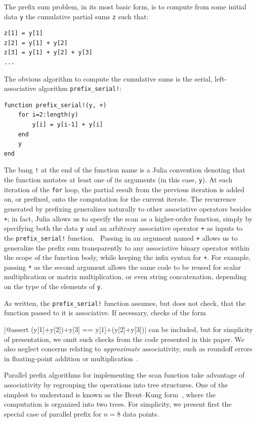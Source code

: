 \documentclass{sig-alternate}
\newcommand{\code}[1]{\texttt{#1}}
\begin{document}
The prefix sum problem, in its most basic form, is to compute from some initial
data \code{y} the cumulative partial sums \code{z} such that:

\begin{verbatim}
z[1] = y[1]
z[2] = y[1] + y[2]
z[3] = y[1] + y[2] + y[3]
...
\end{verbatim}
%
The obvious algorithm to compute the cumulative sums is the serial,
left-associative algorithm \code{prefix\allowbreak\_serial!}:

\begin{verbatim}
function prefix_serial!(y, +)
    for i=2:length(y)
        y[i] = y[i-1] + y[i]
    end
    y
end
\end{verbatim}

The bang \code{!} at the end of the function name is a Julia convention
denoting that the function mutates at least one of its arguments (in this case,
\code{y}). At each iteration of the \code{for} loop, the partial result from
the previous iteration is added on, or prefixed, onto the computation for the
current iterate. The recurrence generated by prefixing generalizes naturally to
other associative operators besides \code{+}; in fact, Julia allows us to
specify the scan as a higher-order function, simply by specifying both the data
\code{y} and an arbitrary associative operator \code{+} as inputs to the
\code{prefix\allowbreak\_serial!} function.~\cite{Shah2013} Passing in an
argument named \code{+} allows us to generalize the prefix sum transparently to
any associative binary operator within the scope of the function body, while
keeping the infix syntax for \code{+}. For example, passing \code{*} as the
second argument allows the same code to be reused for scalar multiplication or
matrix multiplication, or even string concatenation, depending on the type of
the elements of \code{y}. 

As written, the \code{prefix\allowbreak\_serial!} function assumes, but does not check,
that the function passed to it is associative. If necessary, checks of the form

|@assert (y[1]+y[2])+y[3] == y[1]+(y[2]+y[3])|
%
can be included, but for simplicity of presentation, we omit such checks from
the code presented in this paper. We also neglect concerns relating to
\textit{approximate} associativity, such as roundoff errors in floating-point
addition or multiplication~\cite{Mathias1995}.

Parallel prefix algorithms for implementing the scan function take advantage of
associativity by regrouping the operations into tree structures. One of the
simplest to understand is known as the Brent--Kung form~\cite{Brent1982}, where
the computation is organized into two trees. For simplicity, we present first
the special case of parallel prefix for $n=8$ data points.
\end{document}
